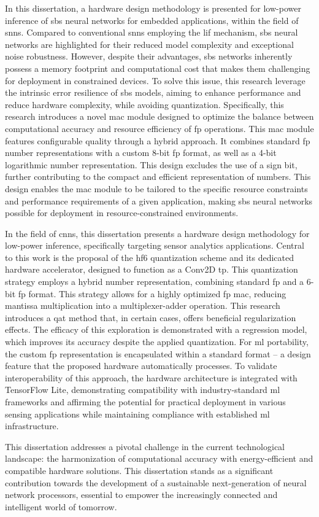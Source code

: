 In this dissertation, a hardware design methodology is presented for low-power inference of \gls{sbs} neural networks for embedded applications, within the field of \glspl{snn}. Compared to conventional \glspl{snn} employing the \gls{lif} mechanism, \gls{sbs} neural networks are highlighted for their reduced model complexity and exceptional noise robustness. However, despite their advantages, \gls{sbs} networks inherently possess a memory footprint and computational cost that makes them challenging for deployment in constrained devices. To solve this issue, this research leverage the intrinsic error resilience of \gls{sbs} models, aiming to enhance performance and reduce hardware complexity, while avoiding quantization. Specifically, this research introduces a novel \gls{mac} module designed to optimize the balance between computational accuracy and resource efficiency of \gls{fp} operations. This \gls{mac} module features configurable quality through a hybrid approach. It combines standard \gls{fp} number representations with a custom 8-bit \gls{fp} format, as well as a 4-bit logarithmic number representation. This design excludes the use of a sign bit, further contributing to the compact and efficient representation of numbers. This design enables the \gls{mac} module to be tailored to the specific resource constraints and performance requirements of a given application, making \gls{sbs} neural networks possible for deployment in resource-constrained environments.

In the field of \glspl{cnn}, this dissertation presents a hardware design methodology for low-power inference, specifically targeting sensor analytics applications. Central to this work is the proposal of the \gls{hf6} quantization scheme and its dedicated hardware accelerator, designed to function as a Conv2D \gls{tp}. This quantization strategy employs a hybrid number representation, combining standard \gls{fp} and a 6-bit \gls{fp} format. This strategy allows for a highly optimized \gls{fp} \gls{mac}, reducing mantissa multiplication into a multiplexer-adder operation. This research introduces a \gls{qat} method that, in certain cases, offers beneficial regularization effects. The efficacy of this exploration is demonstrated with a regression model, which improves its accuracy despite the applied quantization. For \gls{ml} portability, the custom \gls{fp} representation is encapsulated within a standard format -- a design feature that the proposed hardware automatically processes. To validate interoperability of this approach, the hardware architecture is integrated with TensorFlow Lite, demonstrating compatibility with industry-standard \gls{ml} frameworks and affirming the potential for practical deployment in various sensing applications while maintaining compliance with established \gls{ml} infrastructure.


This dissertation addresses a pivotal challenge in the current technological landscape: the harmonization of computational accuracy with energy-efficient and compatible hardware solutions. This dissertation stands as a significant contribution towards the development of a sustainable next-generation of neural network processors, essential to empower the increasingly connected and intelligent world of tomorrow.